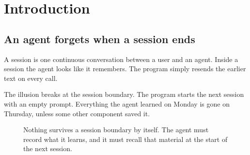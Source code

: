 \documentclass[11pt,a4paper]{article}
\begin{document}
\clearpage
{\sffamily\setlength{\parskip}{0pt}\tableofcontents}
\clearpage
{\sffamily\setlength{\parskip}{0pt}%
 \listoffigures
 \vspace{1.2\baselineskip}
 \listoftables}
\clearpage

\setcounter{page}{1}

\section{Introduction}

\subsection{An agent forgets when a session ends}

A session is one continuous conversation between a user and an agent.
Inside a session the agent looks like it remembers. The program simply
resends the earlier text on every call.

The illusion breaks at the session boundary. The program starts the next
session with an empty prompt. Everything the agent learned on Monday is
gone on Thursday, unless some other component saved it.

\begin{figure}[H]
\centering
{}
\caption[The session boundary]{Nothing survives a session boundary by itself. The agent must
record what it learns, and it must recall that material at the start of
the next session.}
\label{fig:gap}
\end{figure}
\end{document}

